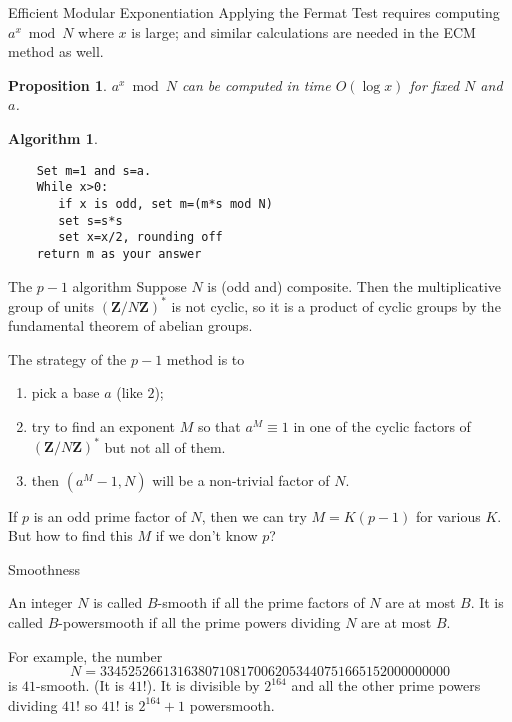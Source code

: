 \documentclass{beamer}
\newtheorem{proposition}{Proposition}
\newtheorem{algorithm}{Algorithm}
\begin{document}
\begin{frame}[fragile]{Efficient Modular Exponentiation}
	Applying the Fermat Test requires computing $a^x\bmod{N}$ where $x$ is
	large; and similar calculations are needed in the ECM method as well.

	\begin{proposition} $a^x\bmod{N}$ can be computed in time $O(\log x)$ for fixed $N$ and $a$. 
	\end{proposition}
	\begin{algorithm}
	\begin{verbatim}
	Set m=1 and s=a.
	While x>0:
	   if x is odd, set m=(m*s mod N)
	   set s=s*s
	   set x=x/2, rounding off
	return m as your answer
	\end{verbatim}
\end{algorithm}
\end{frame}
\begin{frame}{The $p-1$ algorithm}
	Suppose $N$ is (odd and) composite.   Then the multiplicative group of units $(\mathbf{Z}/N\mathbf{Z})^*$ is not cyclic, so it is a product of cyclic 
	groups by the fundamental theorem of abelian groups. 

	\bigskip\noindent
	The strategy of the $p-1$ method is to
	\begin{enumerate}
		\item pick a base $a$ (like $2$);
		\item try to find an exponent $M$ so that $a^{M}\equiv 1$ in one of the cyclic factors of $(\mathbf{Z}/N\mathbf{Z})^*$ but not all of them. 
		\item then $(a^{M}-1,N)$ will be a non-trivial factor of $N$.
	\end{enumerate}	

	\bigskip\noindent
	If $p$ is an odd prime factor of $N$, then we can try $M=K(p-1)$ for various $K$.  But how to find this $M$ if we don't know $p$?

\end{frame}
\begin{frame}{Smoothness}
	\begin{definition}
	An integer $N$ is called $B$-smooth if all the prime factors of $N$ are at most $B$.  It is called $B$-powersmooth if all the prime
	powers dividing $N$ are at most $B$.  
	\end{definition}

	For example, the number
	$$
	N=33452526613163807108170062053440751665152000000000
	$$
	is $41$-smooth. (It is $41!$).  It is divisible by $2^{164}$ and all the other prime powers dividing $41!$ so $41!$ is
	$2^{164}+1$ powersmooth.

	
\end{frame}
\end{document}
